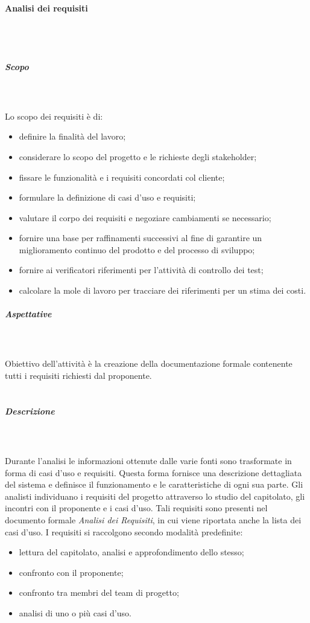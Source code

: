 		\paragraph{Analisi dei requisiti}
		\mbox{}\\ \mbox{}\\
			\subparagraph{Scopo}  \mbox{}\\ \mbox{}\\
			Lo scopo dei requisiti è di:
				\begin{itemize}
					\item definire la finalità del lavoro;
					\item considerare lo scopo del progetto e le richieste degli stakeholder;
					\item fissare le funzionalità e i requisiti concordati col cliente;
					\item formulare la definizione di casi d'uso e requisiti;
					\item valutare il corpo dei requisiti e negoziare cambiamenti se necessario;
					\item fornire  una  base  per  raffinamenti  successivi  al  fine  di garantire  un miglioramento continuo del prodotto e del processo di sviluppo;
					\item fornire ai verificatori riferimenti per l'attività di controllo dei test;
					\item calcolare la mole di lavoro per tracciare dei riferimenti per un stima dei costi.
				\end{itemize}
			\subparagraph{Aspettative} \mbox{}\\ \mbox{}\\
			\noindent Obiettivo dell'attività è la creazione della documentazione formale contenente tutti i requisiti richiesti dal proponente. \\ \\		
			\subparagraph{Descrizione} \mbox{}\\ \mbox{}\\
			Durante l'analisi le informazioni ottenute dalle varie fonti sono trasformate in forma di casi d'uso e requisiti. Questa forma fornisce una descrizione dettagliata del sistema e definisce il funzionamento e le caratteristiche di ogni sua parte.\newline
			Gli analisti individuano i requisiti del progetto attraverso lo studio del capitolato, gli incontri con il proponente e i casi d'uso. Tali requisiti sono 	presenti nel documento formale \textit{Analisi dei Requisiti}, in cui viene riportata 	anche la lista dei casi d'uso. \newline
			\noindent I requisiti si raccolgono secondo modalità predefinite:
			\begin{itemize}
				\item lettura del capitolato\glo, analisi e approfondimento dello stesso;
				\item confronto con il proponente;
				\item confronto tra membri del team di progetto;
				\item analisi di uno o più casi d'uso.  \\
			\end{itemize}
			
